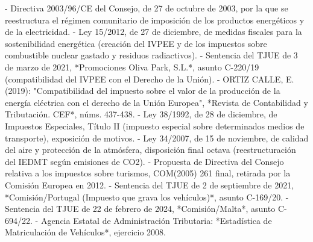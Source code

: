 \documentclass[10pt,a4paper]{article}
\begin{document}
- Directiva 2003/96/CE del Consejo, de 27 de octubre de 2003, por la que se reestructura el régimen comunitario de imposición de los productos energéticos y de la electricidad.
- Ley 15/2012, de 27 de diciembre, de medidas fiscales para la sostenibilidad energética (creación del IVPEE y de los impuestos sobre combustible nuclear gastado y residuos radiactivos).
- Sentencia del TJUE de 3 de marzo de 2021, *Promociones Oliva Park, S.L.*, asunto C-220/19 (compatibilidad del IVPEE con el Derecho de la Unión).
- ORTIZ CALLE, E. (2019): "Compatibilidad del impuesto sobre el valor de la producción de la energía eléctrica con el derecho de la Unión Europea", *Revista de Contabilidad y Tributación. CEF*, núms. 437-438.
- Ley 38/1992, de 28 de diciembre, de Impuestos Especiales, Título II (impuesto especial sobre determinados medios de transporte), exposición de motivos.
- Ley 34/2007, de 15 de noviembre, de calidad del aire y protección de la atmósfera, disposición final octava (reestructuración del IEDMT según emisiones de CO2).
- Propuesta de Directiva del Consejo relativa a los impuestos sobre turismos, COM(2005) 261 final, retirada por la Comisión Europea en 2012.
- Sentencia del TJUE de 2 de septiembre de 2021, *Comisión/Portugal (Impuesto que grava los vehículos)*, asunto C-169/20.
- Sentencia del TJUE de 22 de febrero de 2024, *Comisión/Malta*, asunto C-694/22.
- Agencia Estatal de Administración Tributaria: *Estadística de Matriculación de Vehículos*, ejercicio 2008.
\end{document}
